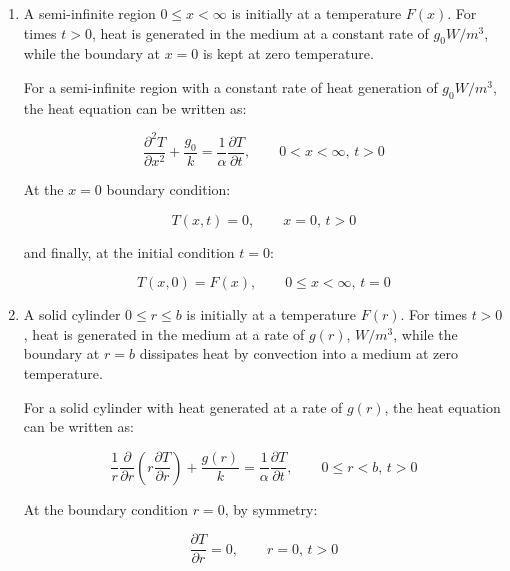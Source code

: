 \documentclass[letterpaper,12pt]{article}
\begin{document}
\begin{enumerate}
    \item A semi-infinite region $0 \leq x < \infty$ is initially at a temperature $F\left( x \right)$. For times $t > 0$, heat is generated in the medium at a constant rate of $g_0 W/m^3$, while the boundary at $x = 0$ is kept at zero temperature.
    
    For a semi-infinite region with a constant rate of heat generation of $g_0 W/m^3$, the heat equation can be written as:

    \begin{equation}
    \frac{\partial^2 T}{\partial x^2} + \frac{g_0}{k} = \frac{1}{\alpha} \frac{\partial T}{\partial t}, \qquad 0 < x < \infty, \, t > 0
    \end{equation}

    At the $x = 0$ boundary condition:

    \begin{equation}
        T(x, t) = 0, \qquad x = 0, \, t > 0
    \end{equation}

    and finally, at the initial condition $t = 0$:

    \begin{equation}
        T(x, 0) = F(x), \qquad 0 \leq x < \infty, \, t = 0 
    \end{equation}

    

    \item A solid cylinder $0 \leq r \leq b$ is initially at a temperature $F\left( r \right)$. For times $t > 0$, heat is generated in the medium at a rate of $g\left( r \right)$, $W/m^3$, while the boundary at $r = b$ dissipates heat by convection into a medium at zero temperature.
    
    For a solid cylinder with heat generated at a rate of $g\left( r \right)$, the heat equation can be written as:

    \begin{equation}
        \frac{1}{r}\frac{\partial}{\partial r} \left(r \frac{\partial T}{\partial r} \right) + \frac{g\left(r \right)}{k} = \frac{1}{\alpha} \frac{\partial T}{\partial t}, \qquad 0 \leq r < b, \, t > 0
    \end{equation}

    At the boundary condition $r = 0$, by symmetry:

    \begin{equation}
        \frac{\partial T}{\partial r} = 0, \qquad r = 0, \, t > 0
    \end{equation}


\end{enumerate}
\end{document}
